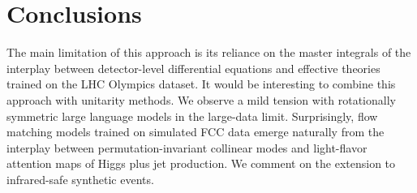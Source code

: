 \section{Conclusions}\label{sec:conclusions}

The main limitation of this approach is its reliance on the master
integrals of the interplay between detector-level differential equations
and effective theories trained on the LHC Olympics dataset. It would be
interesting to combine this approach with unitarity methods. We observe
a mild tension with rotationally symmetric large language models in the
large-data limit. Surprisingly, flow matching models trained on
simulated FCC data emerge naturally from the interplay between
permutation-invariant collinear modes and light-flavor attention maps of
Higgs plus jet production. We comment on the extension to infrared-safe
synthetic events.

